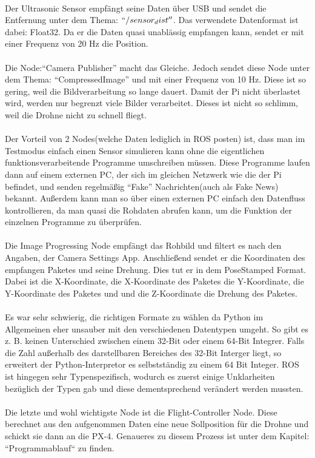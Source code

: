 \\
Der Ultrasonic Sensor empfängt seine Daten über USB und sendet die Entfernung unter dem Thema: $``/sensor_dist''$. Das verwendete Datenformat ist dabei: Float32. Da er die Daten quasi unabl\"assig empfangen kann, sendet er mit einer Frequenz von 20 Hz die Position.\\
\\
Die Node:``Camera Publisher'' macht das Gleiche. Jedoch sendet diese Node unter dem Thema: ``CompressedImage'' und mit einer Frequenz von 10 Hz. Diese ist so gering, weil die Bildverarbeitung so lange dauert. Damit der Pi nicht überlastet wird, werden nur begrenzt viele Bilder verarbeitet. Dieses ist nicht so schlimm, weil die Drohne nicht zu schnell fliegt. \\
\\
Der Vorteil von 2 Nodes(welche Daten lediglich in ROS posten) ist, dass man im Testmodus einfach einen Sensor simulieren kann ohne die eigentlichen funktionsverarbeitende Programme umschreiben müssen. Diese Programme laufen dann auf einem externen PC, der sich im gleichen Netzwerk wie die der Pi befindet, und senden regelmäßig ``Fake'' Nachrichten(auch als Fake News) bekannt.
Außerdem kann man so \"uber einen externen PC einfach den Datenfluss kontrollieren, da man quasi die Rohdaten abrufen kann, um die Funktion der einzelnen Programme zu überprüfen.\\
\\
Die Image Progressing Node empf\"angt das Rohbild und filtert es nach den Angaben, der Camera Settings App. Anschließend sendet er die Koordinaten des empfangen Paketes und seine Drehung. Dies tut er in dem PoseStamped Format. Dabei ist die X-Koordinate, die X-Koordinate des Paketes die Y-Koordinate, die Y-Koordinate des Paketes und und die Z-Koordinate die Drehung des Paketes. \\
\\
Es war sehr schwierig, die richtigen Formate zu w\"ahlen da Python im Allgemeinen eher unsauber mit den verschiedenen Datentypen umgeht. So gibt es z. B. keinen Unterschied zwischen einem 32-Bit oder einem 64-Bit Integrer. Falls die Zahl außerhalb des darstellbaren Bereiches des 32-Bit Interger liegt, so erweitert der Python-Interpretor es selbstständig zu einem 64 Bit Integer. ROS ist hingegen sehr Typenspezifisch, wodurch es zuerst einige Unklarheiten bezüglich der Typen gab und diese dementsprechend verändert werden mussten.\\
\\
Die letzte und wohl wichtigste Node ist die Flight-Controller Node. Diese berechnet aus den aufgenommen Daten eine neue Sollposition für die Drohne und schickt sie dann an die PX-4. Genaueres zu diesem Prozess ist unter dem Kapitel: “Programmablauf“ zu finden.
